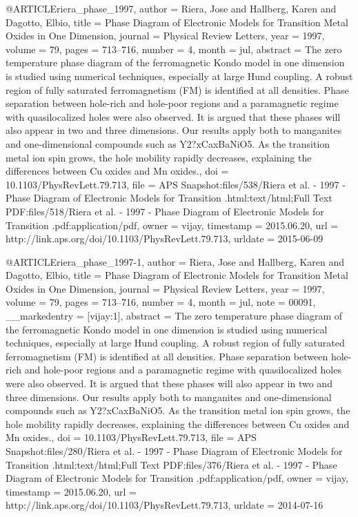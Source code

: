 @ARTICLE{riera_phase_1997,
  author = {Riera, Jose and Hallberg, Karen and Dagotto, Elbio},
  title = {Phase {Diagram} of {Electronic} {Models} for {Transition} {Metal}
	{Oxides} in {One} {Dimension}},
  journal = {Physical Review Letters},
  year = {1997},
  volume = {79},
  pages = {713--716},
  number = {4},
  month = jul,
  abstract = {The zero temperature phase diagram of the ferromagnetic Kondo model
	in one dimension is studied using numerical techniques, especially
	at large Hund coupling. A robust region of fully saturated ferromagnetism
	(FM) is identified at all densities. Phase separation between hole-rich
	and hole-poor regions and a paramagnetic regime with quasilocalized
	holes were also observed. It is argued that these phases will also
	appear in two and three dimensions. Our results apply both to manganites
	and one-dimensional compounds such as Y2?xCaxBaNiO5. As the transition
	metal ion spin grows, the hole mobility rapidly decreases, explaining
	the differences between Cu oxides and Mn oxides.},
  doi = {10.1103/PhysRevLett.79.713},
  file = {APS Snapshot:files/538/Riera et al. - 1997 - Phase Diagram of Electronic Models for Transition .html:text/html;Full Text PDF:files/518/Riera et al. - 1997 - Phase Diagram of Electronic Models for Transition .pdf:application/pdf},
  owner = {vijay},
  timestamp = {2015.06.20},
  url = {http://link.aps.org/doi/10.1103/PhysRevLett.79.713},
  urldate = {2015-06-09}
}

@ARTICLE{riera_phase_1997-1,
  author = {Riera, Jose and Hallberg, Karen and Dagotto, Elbio},
  title = {Phase {Diagram} of {Electronic} {Models} for {Transition} {Metal}
	{Oxides} in {One} {Dimension}},
  journal = {Physical Review Letters},
  year = {1997},
  volume = {79},
  pages = {713--716},
  number = {4},
  month = jul,
  note = {00091},
  __markedentry = {[vijay:1]},
  abstract = {The zero temperature phase diagram of the ferromagnetic Kondo model
	in one dimension is studied using numerical techniques, especially
	at large Hund coupling. A robust region of fully saturated ferromagnetism
	(FM) is identified at all densities. Phase separation between hole-rich
	and hole-poor regions and a paramagnetic regime with quasilocalized
	holes were also observed. It is argued that these phases will also
	appear in two and three dimensions. Our results apply both to manganites
	and one-dimensional compounds such as Y2?xCaxBaNiO5. As the transition
	metal ion spin grows, the hole mobility rapidly decreases, explaining
	the differences between Cu oxides and Mn oxides.},
  doi = {10.1103/PhysRevLett.79.713},
  file = {APS Snapshot:files/280/Riera et al. - 1997 - Phase Diagram of Electronic Models for Transition .html:text/html;Full Text PDF:files/376/Riera et al. - 1997 - Phase Diagram of Electronic Models for Transition .pdf:application/pdf},
  owner = {vijay},
  timestamp = {2015.06.20},
  url = {http://link.aps.org/doi/10.1103/PhysRevLett.79.713},
  urldate = {2014-07-16}
}

